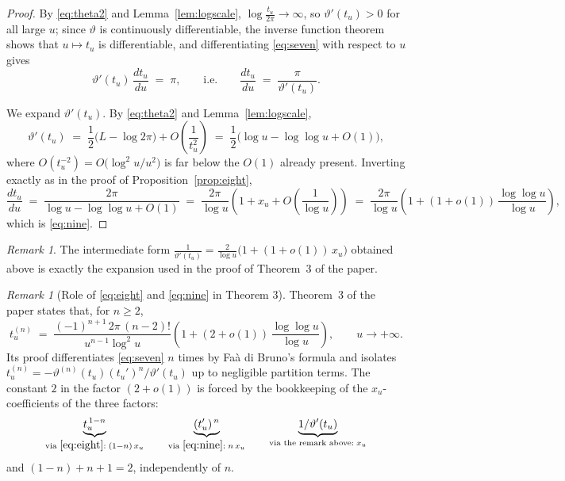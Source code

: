 \documentclass[11pt]{article}
\theoremstyle{remark}
\newtheorem{remark}[theorem]{Remark}
\begin{document}
\begin{proof}
  By \eqref{eq:theta2} and Lemma~\ref{lem:logscale},
  $\log\frac{t_u}{2\pi} \to \infty$, so $\vartheta'(t_u) > 0$ for all
  large $u$; since $\vartheta$ is continuously differentiable, the
  inverse function theorem shows that $u \mapsto t_u$ is differentiable,
  and differentiating \eqref{eq:seven} with respect to $u$ gives
  \[
    \vartheta'(t_u)\,\frac{dt_u}{du} \;=\; \pi,
    \qquad\text{i.e.}\qquad
    \frac{dt_u}{du} \;=\; \frac{\pi}{\vartheta'(t_u)} .
  \]

  We expand $\vartheta'(t_u)$. By \eqref{eq:theta2} and
  Lemma~\ref{lem:logscale},
  \[
    \vartheta'(t_u)
      \;=\; \frac{1}{2}\bigl(L - \log 2\pi\bigr)
            + O\!\left(\frac{1}{t_u^{2}}\right)
      \;=\; \frac{1}{2}\bigl(\log u - \log\log u + O(1)\bigr),
  \]
  where $O(t_u^{-2}) = O\!\bigl(\log^2 u / u^2\bigr)$ is far below the
  $O(1)$ already present. Inverting exactly as in the proof of
  Proposition~\ref{prop:eight},
  \[
    \frac{dt_u}{du}
      \;=\; \frac{2\pi}{\log u - \log\log u + O(1)}
      \;=\; \frac{2\pi}{\log u}
            \left(1 + x_u + O\!\left(\frac{1}{\log u}\right)\right)
      \;=\; \frac{2\pi}{\log u}
            \left(1 + (1+o(1))\,\frac{\log\log u}{\log u}\right),
  \]
  which is \eqref{eq:nine}.
\end{proof}

\begin{remark}
  The intermediate form
  $\frac{1}{\vartheta'(t_u)} = \frac{2}{\log u}
   \bigl(1 + (1+o(1))\,x_u\bigr)$
  obtained above is exactly the expansion used in the proof of
  Theorem~3 of the paper.
\end{remark}

\begin{remark}[Role of \eqref{eq:eight} and \eqref{eq:nine} in Theorem 3]
  Theorem~3 of the paper states that, for $n \ge 2$,
  \[
    t_u^{(n)} \;=\; \frac{(-1)^{n+1}\, 2\pi\,(n-2)!}{u^{n-1}\log^2 u}
      \left(1 + (2+o(1))\,\frac{\log\log u}{\log u}\right),
    \qquad u \to +\infty .
  \]
  Its proof differentiates \eqref{eq:seven} $n$ times by Fa\`a di
  Bruno's formula and isolates
  $t_u^{(n)} = -\vartheta^{(n)}(t_u)(t_u')^n / \vartheta'(t_u)$ up to
  negligible partition terms. The constant $2$ in the factor
  $(2+o(1))$ is forced by the bookkeeping of the $x_u$-coefficients of
  the three factors:
  \[
    \underbrace{t_u^{\,1-n}}_{\text{via } \eqref{eq:eight}:\; (1-n)\,x_u}
    \qquad
    \underbrace{(t_u')^{\,n}}_{\text{via } \eqref{eq:nine}:\; n\,x_u}
    \qquad
    \underbrace{1/\vartheta'(t_u)}_{\text{via the remark above}:\; x_u}
  \]
  and $(1-n) + n + 1 = 2$, independently of $n$.
\end{remark}
\end{document}
